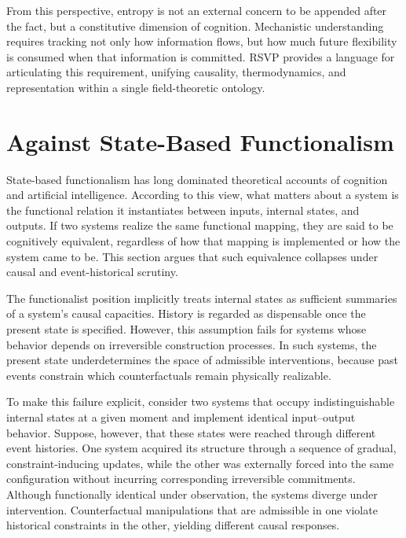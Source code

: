 \documentclass[11pt]{article}
\begin{document}
From this perspective, entropy is not an external concern to be appended after
the fact, but a constitutive dimension of cognition. Mechanistic understanding
requires tracking not only how information flows, but how much future
flexibility is consumed when that information is committed. RSVP provides a
language for articulating this requirement, unifying causality, thermodynamics,
and representation within a single field-theoretic ontology.

\section{Against State-Based Functionalism}

State-based functionalism has long dominated theoretical accounts of cognition
and artificial intelligence. According to this view, what matters about a system
is the functional relation it instantiates between inputs, internal states, and
outputs. If two systems realize the same functional mapping, they are said to be
cognitively equivalent, regardless of how that mapping is implemented or how
the system came to be. This section argues that such equivalence collapses under
causal and event-historical scrutiny.

The functionalist position implicitly treats internal states as sufficient
summaries of a system’s causal capacities. History is regarded as dispensable
once the present state is specified. However, this assumption fails for systems
whose behavior depends on irreversible construction processes. In such systems,
the present state underdetermines the space of admissible interventions, because
past events constrain which counterfactuals remain physically realizable.

To make this failure explicit, consider two systems that occupy indistinguishable
internal states at a given moment and implement identical input--output
behavior. Suppose, however, that these states were reached through different
event histories. One system acquired its structure through a sequence of
gradual, constraint-inducing updates, while the other was externally forced
into the same configuration without incurring corresponding irreversible
commitments. Although functionally identical under observation, the systems
diverge under intervention. Counterfactual manipulations that are admissible in
one violate historical constraints in the other, yielding different causal
responses.
\end{document}
